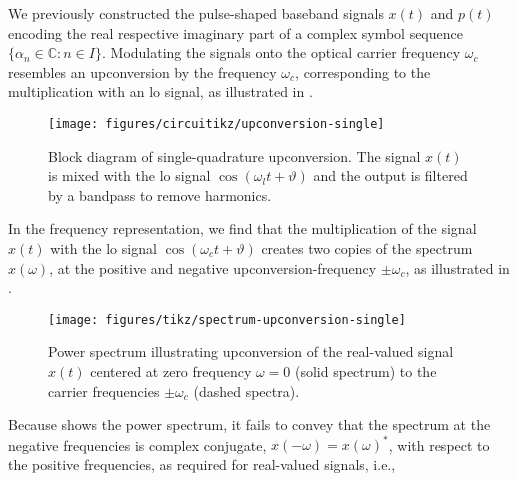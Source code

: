 We previously constructed the pulse-shaped baseband signals $x(t)$ and $p(t)$ encoding the real respective imaginary part of a complex symbol sequence $\{\alpha_n\in\mathbb{C}\colon n\in I\}$.
Modulating the signals onto the optical carrier frequency $\omega_c$ resembles an upconversion by the frequency $\omega_c$, corresponding to the multiplication with an \gls{lo} signal, as illustrated in .
\begin{figure}[htb]
	\centering
	\texttt{[image: figures/circuitikz/upconversion-single]}
	\caption{Block diagram of single-quadrature upconversion. The signal $x(t)$ is mixed with the \gls{lo} signal $\cos(\omega_lt+\vartheta)$ and the output is filtered by a bandpass to remove harmonics.}\label{fig:upconversion_single}
\end{figure}
In the frequency representation, we find that the multiplication of the signal $x(t)$ with the \gls{lo} signal $\cos(\omega_ct+\vartheta)$ creates two copies of the spectrum $x(\omega)$, at the positive and negative upconversion-frequency $\pm\omega_c$, as illustrated in .
\begin{figure}[htb]
	\centering
	\texttt{[image: figures/tikz/spectrum-upconversion-single]}
	\caption{Power spectrum illustrating upconversion of the real-valued signal $x(t)$ centered at zero frequency $\omega=0$ (solid spectrum) to the carrier frequencies $\pm\omega_c$ (dashed spectra).}\label{fig:spectrum_upconversion_single}
\end{figure}
Because  shows the power spectrum, it fails to convey that the spectrum at the negative frequencies is complex conjugate, $x(-\omega)=x(\omega)^*$, with respect to the positive frequencies, as required for real-valued signals, i.e.,
